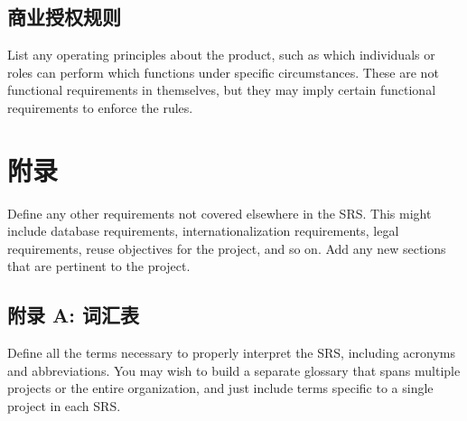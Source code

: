 \documentclass{ctexart}
\begin{document}
\subsection{商业授权规则}
List any operating principles about the product, such as which individuals or 
roles can perform which functions under specific circumstances. These are not 
functional requirements in themselves, but they may imply certain functional 
requirements to enforce the rules.



\section{附录}\label{S:appendix}
Define any other requirements not covered elsewhere in the SRS. This might 
include database requirements, internationalization requirements, legal 
requirements, reuse objectives for the project, and so on. Add any new sections 
that are pertinent to the project.
\subsection{附录 A: 词汇表}
Define all the terms necessary to properly interpret the SRS, including 
acronyms and abbreviations. You may wish to build a separate glossary that spans 
multiple projects or the entire organization, and just include terms specific to 
a single project in each SRS.
\end{document}
